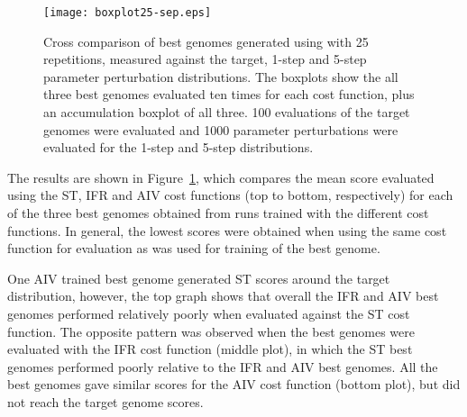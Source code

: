 \begin{figure}[th!]
  \centering
  \texttt{[image: boxplot25-sep.eps]}\\
  \caption{Cross comparison of best genomes generated using {\GA} with 25
    repetitions, measured against the target, 1-step and 5-step
    parameter perturbation distributions.  The boxplots show the all
    three best genomes evaluated ten times for each cost function,
    plus an accumulation boxplot of all three. 100 evaluations of the
    target genomes were evaluated and 1000 parameter perturbations
    were evaluated for the 1-step and 5-step
    distributions.}\label{fig:GA:R2A}
\end{figure}

\smallskip{}

The results are shown in Figure~\ref{fig:GA:R2A}, which compares the mean
score evaluated using the ST, IFR and AIV cost functions (top to
bottom, respectively) for each of the three best genomes obtained from
{\GA} runs trained with the different cost functions. In general, the
lowest scores were obtained when using the same cost function for
evaluation as was used for training of the best genome.

\smallskip{}

One AIV trained best genome generated ST scores around the target distribution,
however, the top graph shows that overall the IFR and AIV best genomes performed
relatively poorly when evaluated against the ST cost function.  The opposite
pattern was observed when the best genomes were evaluated with the IFR cost
function (middle plot), in which the ST best genomes performed poorly relative
to the IFR and AIV best genomes. All the best genomes gave similar scores for
the AIV cost function (bottom plot), but did not reach the target genome scores.


